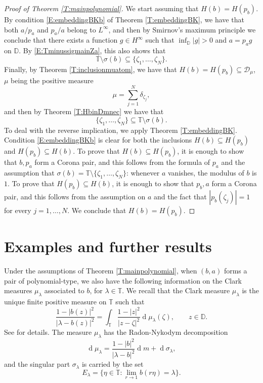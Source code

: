 \documentclass[12pt]{amsart}
\theoremstyle{definition}
\theoremstyle{remark}
\theoremstyle{remark}
\begin{document}
\begin{proof}[Proof of Theorem \ref{T:mainpolynomial}]
    We start assuming that $H(b)=H(p_b)$. By condition \ref{E:embeddingBKb} of Theorem \ref{T:embeddingBK}, we have that both $a/p_a$ and $p_a/a$ belong to $L^\infty$, and then by Smirnov's maximum principle we conclude that there exists a function $g\in H^\infty$ such that $\inf_{\mathbb{D}}|g|>0$ and $a=p_a g$ on $\mathbb{D}$. By \eqref{E:TminussigmainZa}, this also shows that 
    \[\mathbb{T}\setminus\sigma(b)\subseteq \{\zeta_1,\ldots,\zeta_N\}.\]
    Finally, by Theorem \ref{T:inclusionmuatom}, we have that $H(b)=H(p_b)\subseteq \mathcal{D}_\mu$, $\mu$ being the positive measure
    \[\mu=\sum_{j=1}^N\delta_{\zeta_j},\]
    and then by Theorem \ref{T:HbinDmnec} we have that  \[ \{\zeta_1,\ldots,\zeta_N\}\subseteq\mathbb{T}\setminus\sigma(b).\]
    To deal with the reverse implication, we apply Theorem \ref{T:embeddingBK}. Condition \ref{E:embeddingBKb} is clear for both the inclusions $H(b)\subseteq H(p_b)$ and $H(p_b)\subseteq H(b)$. To prove that $H(b)\subseteq H(p_b)$, it is enough to show that $b,p_a$ form a Corona pair, and this follows from the formula of $p_a$ and the assumption that $\sigma(b)=\mathbb{T}\setminus \{\zeta_1,\ldots,\zeta_N\}$: whenever $a$ vanishes, the modulus of $b$ is $1$. To prove that $H(p_b)\subseteq H(b)$, it is enough to show that $p_b,a$ form a Corona pair, and this follows from the assumption on $a$ and the fact that $|p_b(\zeta_j)|=1$ for every $j=1,\ldots,N$. We conclude that $H(b)=H(p_b)$.
\end{proof}

\section{Examples and further results} \label{S:examples}

Under the assumptions of Theorem \ref{T:mainpolynomial}, when $(b,a)$ forms a pair of polynomial-type, we also have the following information on the Clark measures $\mu_\lambda$ associated to $b$, for $\lambda\in\mathbb{T}$. We recall that the Clark measure $\mu_\lambda$ is the unique finite positive measure on $\mathbb{T}$ such that 
\[\frac{1-|b(z)|^2}{|\lambda-b(z)|^2} = \int_{\mathbb{T}}\frac{1-|z|^2}{|z-\zeta|^2}\operatorname{d}\!\mu_\lambda(\zeta), \qquad z\in\mathbb{D}.\]
See \cite[Section 9]{cauchytransform} for details. The measure $\mu_\lambda$ has the Radon-Nykodym decomposition
\[\operatorname{d}\!\mu_\lambda = \frac{1-|b|^2}{|\lambda-b|^2}\operatorname{d}\!m + \operatorname{d}\!\sigma_{\lambda},\]
and the singular part $\sigma_\lambda$ is carried by the set
\begin{equation}\label{E:carrier}
    E_\lambda=\{\eta\in\mathbb{T}\colon \lim_{r\to 1}b(r\eta)=\lambda\}.
\end{equation}
\end{document}
